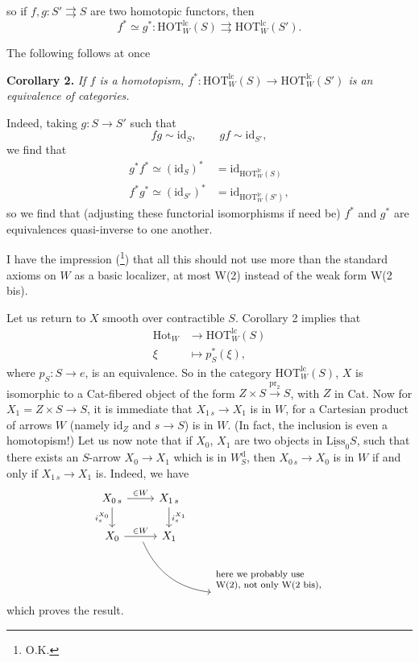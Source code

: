\documentclass[11pt]{article}
\newcommand{\printedpage}[1]{\marginpar{\footnotesize p.~#1}}
\newcommand{\msp}[1]{\marginpar{\footnotesize [#1]}}
\newcommand{\HOTlc}{\mathrm{HOT}^{\mathrm{lc}}_W}
\newcommand{\Hot}{\mathrm{Hot}}
\newcommand{\id}{\mathrm{id}}
\newcommand{\Wd}{W^{\mathrm{d}}_S}
\begin{document}
\printedpage{34}

\msp{page 46}
so if $f,g : S' \rightrightarrows S$ are two homotopic functors, then
\[ f^* \simeq g^* : \HOTlc(S) \rightrightarrows \HOTlc(S'). \]

The following follows at once

\textbf{Corollary 2.} \textit{If $f$ is a homotopism, $f^* : \HOTlc(S) \longrightarrow \HOTlc(S')$ is an equivalence of categories.}

Indeed, taking $g : S \longrightarrow S'$ such that
\[ fg \sim \id_S, \qquad gf \sim \id_{S'}, \]
we find that
\[ \begin{aligned}
g^*f^* \simeq (\id_S)^* &= \id_{\HOTlc(S)} \\
f^*g^* \simeq (\id_{S'})^* &= \id_{\HOTlc(S')},
\end{aligned} \]
so we find that (adjusting these functorial isomorphisms if need be) $f^*$ and $g^*$ are equivalences quasi-inverse to one another.

I have the impression (\footnote[54]{O.K.}) that all this should not use more than the standard axioms on $W$ as a basic localizer, at most W(2) instead of the weak form W(2 bis).

Let us return to $X$ smooth over contractible $S$. Corollary 2 implies that
\[ \begin{aligned}
\Hot_W &\longrightarrow \HOTlc(S) \\
\xi &\longmapsto p^*_S(\xi),
\end{aligned} \]
where $p_S : S \longrightarrow e$, is an equivalence. So in the category $\HOTlc(S)$, $X$ is isomorphic \msp{page 47} to a Cat-fibered object of the form $Z \times S \xrightarrow{\mathrm{pr}_2} S$, with $Z$ in Cat. Now for $X_1 = Z \times S \longrightarrow S$, it is immediate that $X_{1\,s} \longrightarrow X_1$ is in $W$, for a Cartesian product of arrows $W$ (namely $\id_Z$ and $s \longrightarrow S$) is in $W$. (In fact, the inclusion is even a homotopism!) Let us now note that if $X_0$, $X_1$ are two objects in $\underline{\mathrm{Liss}}_0S$, such that there exists an $S$-arrow $X_0 \longrightarrow X_1$ which is in $\Wd$, then $X_{0\,s} \longrightarrow X_0$ is in $W$ if and only if $X_{1\,s} \longrightarrow X_1$ is. Indeed, we have
\[ \begin{tikzcd}
X_{0\,s} \arrow[r, "\in W"] \arrow[d, "i_s^{X_0}"'] & X_{1\,s} \arrow[d, "i_s^{X_1}"] & \\
X_0 \arrow[r, "\in W", ""{name=A, below}] & X_1 & \\
 & & \text{\footnotesize\begin{tabular}{@{}l@{}}here we probably use\\ W(2), not only W(2 bis),\end{tabular}}
\arrow[from=A, to=3-3, bend right]
\end{tikzcd} \]
\printedpage{35}
which proves the result.
\end{document}
